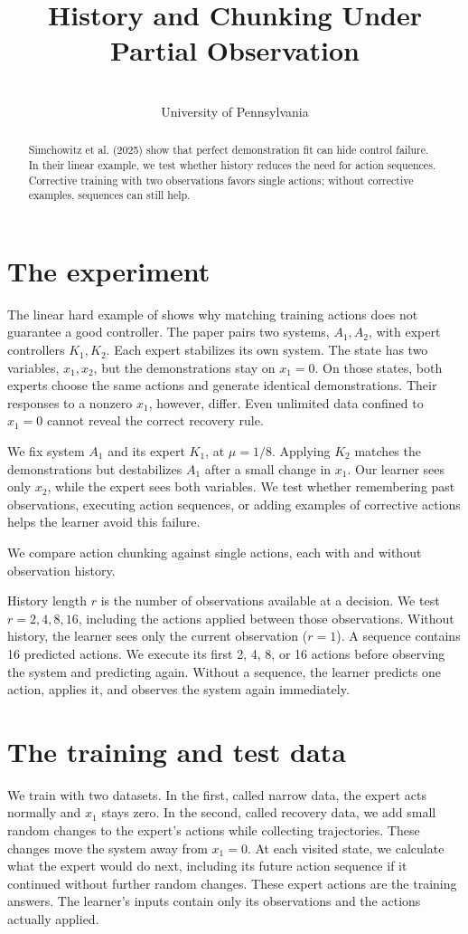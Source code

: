 \documentclass{l4dc2026}
\title[History, Coverage, and Chunking]{History and Chunking Under Partial Observation}
\author{\Name{Nihar Ballamudi}\and\Name{Kyle Horton}\\\addr University of Pennsylvania}
\begin{document}
\maketitle
\begin{abstract}
Simchowitz et al. (2025) show that perfect demonstration fit can hide control failure. In their linear example, we test whether history reduces the need for action sequences. Corrective training with two observations favors single actions; without corrective examples, sequences can still help.
\end{abstract}

\section{The experiment}
The linear hard example of \citet{simchowitz2025} shows why matching training actions does not guarantee a good controller. The paper pairs two systems, $A_1,A_2$, with expert controllers $K_1,K_2$. Each expert stabilizes its own system. The state has two variables, $x_1,x_2$, but the demonstrations stay on $x_1=0$. On those states, both experts choose the same actions and generate identical demonstrations. Their responses to a nonzero $x_1$, however, differ. Even unlimited data confined to $x_1=0$ cannot reveal the correct recovery rule.

We fix system $A_1$ and its expert $K_1$, at $\mu=1/8$. Applying $K_2$ matches the demonstrations but destabilizes $A_1$ after a small change in $x_1$. Our learner sees only $x_2$, while the expert sees both variables. We test whether remembering past observations, executing action sequences, or adding examples of corrective actions helps the learner avoid this failure.

We compare action chunking against single actions, each with and without observation history.

History length $r$ is the number of observations available at a decision. We test $r=2,4,8,16$, including the actions applied between those observations. Without history, the learner sees only the current observation ($r=1$). A sequence contains 16 predicted actions. We execute its first 2, 4, 8, or 16 actions before observing the system and predicting again. Without a sequence, the learner predicts one action, applies it, and observes the system again immediately.

\section{The training and test data}
We train with two datasets. In the first, called narrow data, the expert acts normally and $x_1$ stays zero. In the second, called recovery data, we add small random changes to the expert's actions while collecting trajectories. These changes move the system away from $x_1=0$. At each visited state, we calculate what the expert would do next, including its future action sequence if it continued without further random changes. These expert actions are the training answers. The learner's inputs contain only its observations and the actions actually applied.
\end{document}
